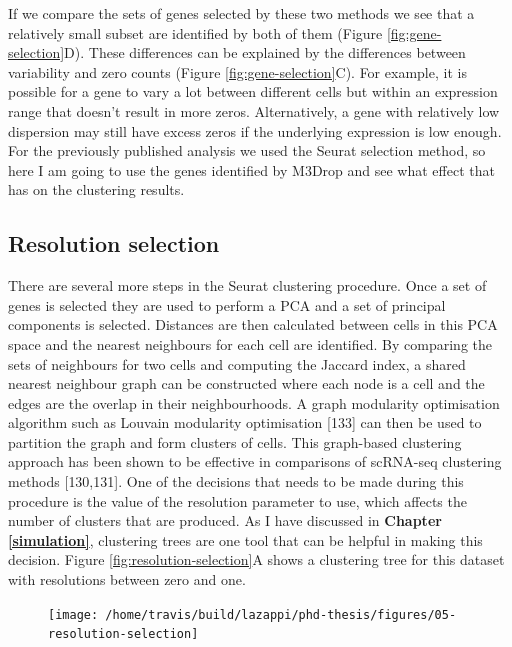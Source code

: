 \documentclass[11pt,a4paper,titlepage,twoside,openright]{style/unimelbthesis}
\theoremstyle{definition}
\theoremstyle{definition}
\theoremstyle{definition}
\theoremstyle{remark}
\begin{document}
\begin{mainmatter}
If we compare the sets of genes selected by these two methods we see that a relatively small subset are identified by both of them (Figure \ref{fig:gene-selection}D). These differences can be explained by the differences between variability and zero counts (Figure \ref{fig:gene-selection}C). For example, it is possible for a gene to vary a lot between different cells but within an expression range that doesn't result in more zeros. Alternatively, a gene with relatively low dispersion may still have excess zeros if the underlying expression is low enough. For the previously published analysis we used the Seurat selection method, so here I am going to use the genes identified by M3Drop and see what effect that has on the clustering results.

\hypertarget{resolution-selection}{%
\subsection{Resolution selection}\label{resolution-selection}}

There are several more steps in the Seurat clustering procedure. Once a set of genes is selected they are used to perform a PCA and a set of principal components is selected. Distances are then calculated between cells in this PCA space and the nearest neighbours for each cell are identified. By comparing the sets of neighbours for two cells and computing the Jaccard index, a shared nearest neighbour graph can be constructed where each node is a cell and the edges are the overlap in their neighbourhoods. A graph modularity optimisation algorithm such as Louvain modularity optimisation {[}133{]} can then be used to partition the graph and form clusters of cells. This graph-based clustering approach has been shown to be effective in comparisons of scRNA-seq clustering methods {[}130,131{]}. One of the decisions that needs to be made during this procedure is the value of the resolution parameter to use, which affects the number of clusters that are produced. As I have discussed in \textbf{Chapter \ref{simulation}}, clustering trees are one tool that can be helpful in making this decision. Figure \ref{fig:resolution-selection}A shows a clustering tree for this dataset with resolutions between zero and one.

\begin{figure}

{\centering \texttt{[image: /home/travis/build/lazappi/phd-thesis/figures/05-resolution-selection]} 

}


\end{figure}
\end{mainmatter}
\end{document}
